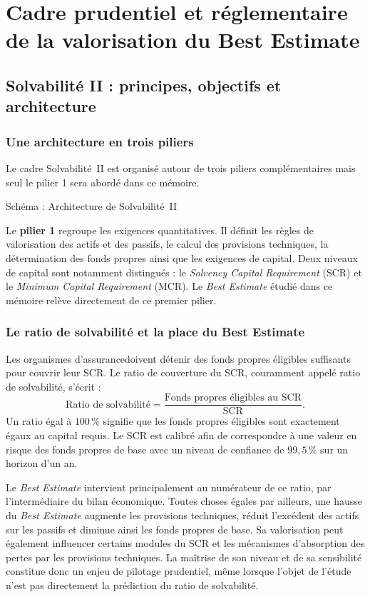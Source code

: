 \chapter{Cadre prudentiel et réglementaire de la valorisation du Best Estimate}

\section{Solvabilité II : principes, objectifs et architecture}

\subsection{Une architecture en trois piliers}

Le cadre Solvabilité~II est organisé autour de trois piliers complémentaires mais seul le pilier 1 sera abordé dans ce mémoire.


Schéma : Architecture de Solvabilité~II

Le \textbf{pilier 1} regroupe les exigences quantitatives. Il définit les règles
de valorisation des actifs et des passifs, le calcul des provisions techniques,
la détermination des fonds propres ainsi que les exigences de capital. Deux
niveaux de capital sont notamment distingués : le \textit{Solvency Capital
Requirement} (SCR) et le \textit{Minimum Capital Requirement} (MCR). Le
\textit{Best Estimate} étudié dans ce mémoire relève directement de ce premier
pilier.

\subsection{Le ratio de solvabilité et la place du Best Estimate}

Les organismes d'assurancedoivent détenir des fonds propres éligibles suffisants pour
couvrir leur SCR. Le ratio de couverture du SCR,
couramment appelé ratio de solvabilité, s'écrit :
\[
    \text{Ratio de solvabilité}
    =
    \frac{\text{Fonds propres éligibles au SCR}}
         {\text{SCR}}.
\]
Un ratio égal à \(100\,\%\) signifie que les fonds propres éligibles sont
exactement égaux au capital requis. Le SCR est calibré afin de correspondre à
une valeur en risque des fonds propres de base avec un niveau de confiance de
\(99{,}5\,\%\) sur un horizon d'un an.

Le \textit{Best Estimate} intervient principalement au numérateur de ce ratio,
par l'intermédiaire du bilan économique. Toutes choses égales par ailleurs, une
hausse du \textit{Best Estimate} augmente les provisions techniques, réduit
l'excédent des actifs sur les passifs et diminue ainsi les fonds propres de
base. Sa valorisation peut également influencer certains modules du SCR et les
mécanismes d'absorption des pertes par les provisions techniques. La maîtrise
de son niveau et de sa sensibilité constitue donc un enjeu de pilotage
prudentiel, même lorsque l'objet de l'étude n'est pas directement la prédiction
du ratio de solvabilité.

